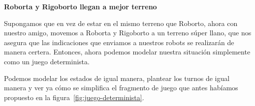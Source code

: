 


\textbf{Roborta y Rigoborto llegan a mejor terreno}

Supongamos que en vez de estar en el mismo terreno que Roborto, ahora con
nuestro amigo, movemos a Roborta y Rigoborto a un terreno súper llano, que nos
asegura que las indicaciones que enviamos a nuestros robots se realizarán de
manera certera. Entonces, ahora podemos modelar nuestra situación simplemente
como un juego determinista.

Podemos modelar los estados de igual manera, plantear los turnos de igual
manera y ver ya cómo se simplifica el fragmento de juego que antes habíamos
propuesto en la figura~\ref{fig:juego-determinista}.

